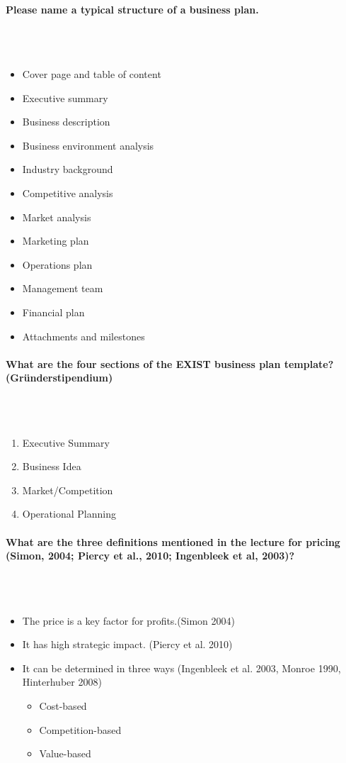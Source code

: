 \documentclass[10pt,a4paper,noendnumber=true]{scrartcl}
\newcommand{\properparagraph}[1]{\paragraph{\textcolor{Emerald}{#1}}\mbox{}\\}
\begin{document}
\properparagraph{Please name a typical structure of a business plan.}
\\[-6ex]
\begin{itemize}
	\item Cover page and table of content
	\item Executive summary
	\item Business description
	\item Business environment analysis
	\item Industry background
	\item Competitive analysis
	\item Market analysis
	\item Marketing plan
	\item Operations plan
	\item Management team
	\item Financial plan
	\item Attachments and milestones
\end{itemize}

\properparagraph{What are the four sections of the EXIST business plan template? (Gründerstipendium)}
\\[-6ex]
\begin{enumerate}
	\item Executive Summary
	\item Business Idea
	\item Market/Competition
	\item Operational Planning
\end{enumerate}


\properparagraph{What are the three definitions mentioned in the lecture for pricing (Simon, 2004; Piercy et al., 2010; Ingenbleek et al, 2003)?}
\\[-6ex]
\begin{itemize}
	\item The price is a key factor for profits.(Simon 2004)
	\item It has high strategic impact. (Piercy et al. 2010)
	\item It can be determined in three ways
	(Ingenbleek et al. 2003, Monroe 1990, Hinterhuber 2008)
	\begin{itemize}
		\item Cost-based
		\item Competition-based
		\item Value-based
	\end{itemize}
\end{itemize}
\end{document}
